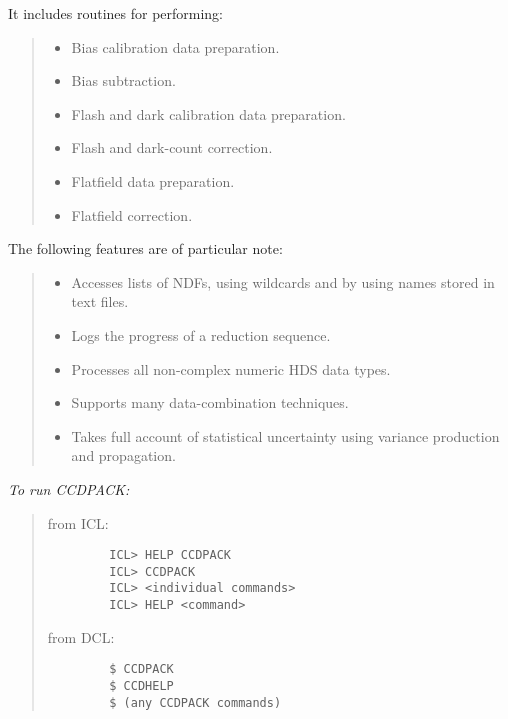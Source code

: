 It includes routines for performing:
{\small
\begin{quote}
\begin{itemize}
\item Bias calibration data preparation.
\item Bias subtraction.
\item Flash and dark calibration data preparation.
\item Flash and dark-count correction.
\item Flatfield data preparation.
\item Flatfield correction.
\end{itemize}
\end{quote}
}
The following features are of particular note:
{\small
\begin{quote}
\begin{itemize}
\item Accesses lists of NDFs, using wildcards and by using names
 stored in text files.
\item Logs the progress of a reduction sequence.
\item Processes all non-complex numeric HDS data types.
\item Supports many data-combination techniques.
\item Takes full account of statistical uncertainty using variance production
 and propagation.
\end{itemize}
\end{quote}
}

{\em To run CCDPACK:}\hfill
\begin{quote}
\begin{description}

\item [from ICL:]\hfill

\begin{small}
\begin{verbatim}
   ICL> HELP CCDPACK
   ICL> CCDPACK
   ICL> <individual commands>
   ICL> HELP <command>
\end{verbatim}
\end{small}


\item [from DCL:]\hfill

\begin{small}
\begin{verbatim}
   $ CCDPACK
   $ CCDHELP
   $ (any CCDPACK commands)
\end{verbatim}
\end{small}

\end{description}
\end{quote}

